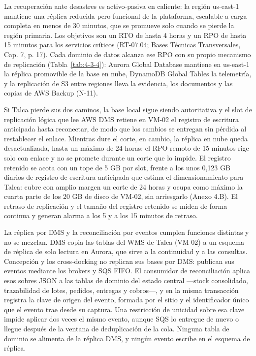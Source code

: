 La recuperación ante desastres es activo-pasiva en caliente: la región us-east-1 mantiene una réplica reducida pero funcional de la plataforma, escalable a carga completa en menos de 30 minutos, que se promueve solo cuando se pierde la región primaria. Los objetivos son un RTO de hasta 4 horas y un RPO de hasta 15 minutos para los servicios críticos (RT-07.04; Bases Técnicas Transversales, Cap. 7, p. 17). Cada dominio de datos alcanza ese RPO con su propio mecanismo de replicación (Tabla~\ref{tab:4-3-4}): Aurora Global Database mantiene en us-east-1 la réplica promovible de la base en nube, DynamoDB Global Tables la telemetría, y la replicación de S3 entre regiones lleva la evidencia, los documentos y las copias de AWS Backup (N-11).

Si Talca pierde sus dos caminos, la base local sigue siendo autoritativa y el slot de replicación lógica que lee AWS DMS retiene en VM-02 el registro de escritura anticipada hasta reconectar, de modo que los cambios se entregan sin pérdida al restablecer el enlace. Mientras dure el corte, en cambio, la réplica en nube queda desactualizada, hasta un máximo de 24 horas: el RPO remoto de 15 minutos rige solo con enlace y no se promete durante un corte que lo impide. El registro retenido se acota con un tope de 5 GB por slot, frente a los unos 0,123 GB diarios de registro de escritura anticipada que estima el dimensionamiento para Talca: cubre con amplio margen un corte de 24 horas y ocupa como máximo la cuarta parte de los 20 GB de disco de VM-02, sin arriesgarlo (Anexo 4.B). El retraso de replicación y el tamaño del registro retenido se miden de forma continua y generan alarma a los 5 y a los 15 minutos de retraso.

La réplica por DMS y la reconciliación por eventos cumplen funciones distintas y no se mezclan. DMS copia las tablas del WMS de Talca (VM-02) a un esquema de réplica de solo lectura en Aurora, que sirve a la continuidad y a las consultas. Concepción y los cross-docking no replican sus bases por DMS: publican sus eventos mediante los brokers y SQS FIFO. El consumidor de reconciliación aplica esos sobres JSON a las tablas de dominio del estado central ---stock consolidado, trazabilidad de lotes, pedidos, entregas y cobros---, y en la misma transacción registra la clave de origen del evento, formada por el sitio y el identificador único que el evento trae desde su captura. Una restricción de unicidad sobre esa clave impide aplicar dos veces el mismo evento, aunque SQS lo entregue de nuevo o llegue después de la ventana de deduplicación de la cola. Ninguna tabla de dominio se alimenta de la réplica DMS, y ningún evento escribe en el esquema de réplica.

